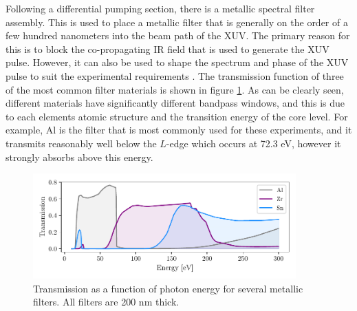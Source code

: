 Following a differential pumping section, there is a metallic spectral filter assembly.  This is used to place a metallic filter that is generally on the order of a few hundred nanometers into the beam path of the XUV.  The primary reason for this is to block the co-propagating IR field that is used to generate the XUV pulse.  However, it can also be used to shape the spectrum and phase of the XUV pulse to suit the experimental requirements \cite{chiniGenerationCharacterizationApplications2014}.  The transmission function of three of the most common filter materials is shown in figure \ref{fig:filters}.  As can be clearly seen, different materials have significantly different bandpass windows, and this is due to each elements atomic structure and the transition energy of the core level.  For example, Al is the filter that is most commonly used for these experiments, and it transmits reasonably well below the $L$-edge which occurs at 72.3 eV, however it strongly absorbs above this energy.
\begin{figure}
	\centering
	\includegraphics[width=0.9\textwidth]{figures/Beamline/filters.pdf}
	\caption[Transmission of several metallic filters]{Transmission as a function of photon energy for several metallic filters.  All filters are 200 nm thick.}
	\label{fig:filters}
\end{figure}

